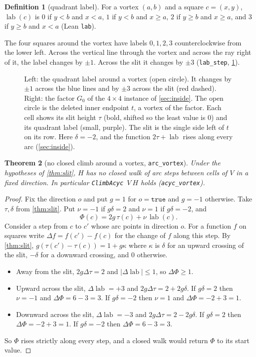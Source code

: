 \documentclass[11pt]{article}
\theoremstyle{plain}
\newtheorem{theorem}{Theorem}[section]
\theoremstyle{definition}
\newtheorem{definition}[theorem]{Definition}
\theoremstyle{remark}
\newcommand{\lean}[1]{\texttt{#1}}
\newcommand{\lab}{\operatorname{lab}}
\begin{document}
\begin{definition}[quadrant label]
For a vortex $(a,b)$ and a square $c=(x,y)$, $\lab(c)$ is $0$ if $y<b$ and $x<a$, $1$ if $y<b$ and
$x\ge a$, $2$ if $y\ge b$ and $x\ge a$, and $3$ if $y\ge b$ and $x<a$ (Lean \lean{lab}).
\end{definition}

The four squares around the vortex have labels $0,1,2,3$ counterclockwise from the lower left.
Across the vertical line through the vortex and across the ray right of it, the label changes by
$\pm1$.
Across the slit it changes by $\pm3$ (\lean{lab\_step}, \cref{fig:vortex}).

\begin{figure}[t]
\centering

\caption{Left: the quadrant label around a vortex (open circle).
It changes by $\pm1$ across the blue lines and by $\pm3$ across the slit (red dashed).
Right: the factor $G_0$ of the $4\times4$ instance of \cref{sec:inside}.
The open circle is the deleted inner endpoint $t$, a vortex of the factor.
Each cell shows its slit height $\tau$ (bold, shifted so the least value is $0$) and its quadrant
label (small, purple).
The slit is the single side left of $t$ on its row.
Here $\delta=-2$, and the function $2\tau+\lab$ rises along every arc (\cref{sec:inside}).}
\label{fig:vortex}
\end{figure}

\begin{theorem}[no closed climb around a vortex, \lean{arc\_vortex}]
\label{thm:vortex}
Under the hypotheses of \cref{thm:slit}, $H$ has no closed walk of arc steps between cells of $V$
in a fixed direction.
In particular \lean{ClimbAcyc}~$V\ H$ holds (\lean{acyc\_vortex}).
\end{theorem}

\begin{proof}
Fix the direction $o$ and put $g=1$ for $o=\lean{true}$ and $g=-1$ otherwise.
Take $\tau,\delta$ from \cref{thm:slit}.
Put $\nu=-1$ if $g\delta=2$ and $\nu=1$ if $g\delta=-2$, and
\[\Phi(c)=2g\,\tau(c)+\nu\,\lab(c).\]
Consider a step from $c$ to $c'$ whose arc points in direction $o$.
For a function $f$ on squares write $\Delta f=f(c')-f(c)$ for the change of $f$ along this step.
By \cref{thm:slit}, $g(\tau(c')-\tau(c))=1+g\kappa$ where $\kappa$ is $\delta$ for an upward
crossing of the slit, $-\delta$ for a downward crossing, and $0$ otherwise.
\begin{itemize}
\item Away from the slit, $2g\Delta\tau=2$ and $|\Delta\lab|\le1$, so $\Delta\Phi\ge1$.
\item Upward across the slit, $\Delta\lab=+3$ and $2g\Delta\tau=2+2g\delta$.
  If $g\delta=2$ then $\nu=-1$ and $\Delta\Phi=6-3=3$.
  If $g\delta=-2$ then $\nu=1$ and $\Delta\Phi=-2+3=1$.
\item Downward across the slit, $\Delta\lab=-3$ and $2g\Delta\tau=2-2g\delta$.
  If $g\delta=2$ then $\Delta\Phi=-2+3=1$.
  If $g\delta=-2$ then $\Delta\Phi=6-3=3$.
\end{itemize}
So $\Phi$ rises strictly along every step, and a closed walk would return $\Phi$ to its start value.
\end{proof}
\end{document}
